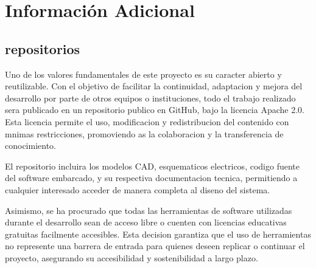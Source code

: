 \chapter{Información Adicional}

\section{repositorios}

Uno de los valores fundamentales de este proyecto es su caracter abierto y reutilizable.
Con el objetivo de facilitar la continuidad, adaptacion y mejora del desarrollo por parte
de otros equipos o instituciones, todo el trabajo realizado sera publicado en un repositorio
publico en GitHub, bajo la licencia Apache 2.0. Esta licencia permite el uso, modificacion y
redistribucion del contenido con mnimas restricciones, promoviendo as la colaboracion y la
transferencia de conocimiento.

El repositorio incluira los modelos CAD, esquematicos electricos, codigo fuente del software
embarcado, y su respectiva documentacion tecnica, permitiendo a cualquier interesado
acceder de manera completa al diseno del sistema.

Asimismo, se ha procurado que todas las herramientas de software utilizadas durante
el desarrollo sean de acceso libre o cuenten con licencias educativas gratuitas facilmente
accesibles. Esta decision garantiza que el uso de herramientas no represente una barrera de
entrada para quienes deseen replicar o continuar el proyecto, asegurando su accesibilidad y
sostenibilidad a largo plazo.
